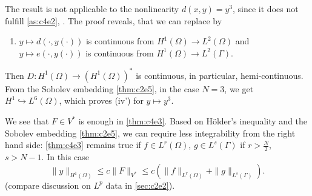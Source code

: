 \documentclass[../skript.tex]{subfiles}
\begin{document}
\begin{remark} %
\label{rem:c4e5}
The result is not applicable to the nonlinearity $d(x, y) = y^3$, since it does not fulfill \cref{as:c4e2}, . The proof reveals, that we can replace  by
\begin{enumerate}[({iv}')]
\item $y \mapsto d(\cdot, y(\cdot))$ is continuous from $H^1(\Omega) \to L^2(\Omega)$ and $y \mapsto e(\cdot, y(\cdot))$ is continuous from $H^1(\Omega) \to L^2(\Gamma)$.
\end{enumerate}
Then $D : H^1(\Omega) \to \left( H^1(\Omega) \right)^*$ is continuous, in particular, hemi-continuous.
From the Sobolev embedding \cref{thm:c2e5}, in the case $N = 3$, we get $H^1 \hookrightarrow L^6(\Omega)$, which proves (iv') for $y \mapsto y^3$.
\end{remark}
\begin{remark} %
\label{rem:c4e6}
We see that $F \in V^*$ is enough in \cref{thm:c4e3}. Based on Hölder's inequality and the Sobolev embedding \cref{thm:c2e5}, we can require less integrability from the right hand side: \cref{thm:c4e3} remains true if $f \in L^r(\Omega)$, $g \in L^s(\Gamma)$ if $r > \frac{N}{2}$, $s > N -1$. In this case
\[
	\| y \|_{H^1(\Omega)} \leq c \| F \|_{V^*} \leq c \left( \| f \|_{L^r(\Omega)} + \| g \|_{L^s(\Gamma)} \right).
\]
(compare discussion on $L^p$ data in \cref{sec:c2e2}).
\end{remark}
\end{document}
